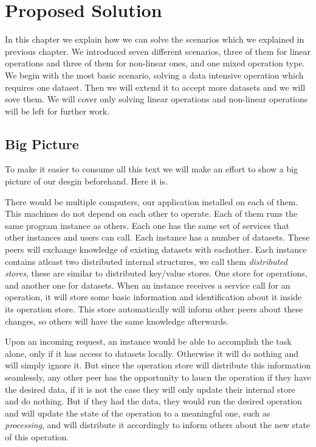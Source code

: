 \chapter{Proposed Solution}
\label{cha:proposal}
In this chapter we explain how we can solve the scenarios which we explained in previous chapter.
We introduced seven different scenarios, three of them for linear operations and three of them for non-linear
ones, and one mixed operation type. We begin with the most basic scenario, solving a data intensive operation
which requires one dataset. Then we will extend it to accept more datasets and we will sove them. We will
cover only solving linear operations and non-linear operations will be left for further work.

\section{Big Picture}
To make it easier to consume all this text we will make an effort to show a big picture of our desgin beforehand. Here it is.

There would be multiple computers, our application installed on each of them. This machines do not depend on each
other to operate. Each of them runs the same program instance as others. Each one has the same set of services that
other instances and users can call. Each instance has a number of datasets. These peers will exchange knowledge of
existing datasets with eachother. Each instance contains atleast two distributed internal structures,
we call them \textit{distributed stores}, these are similar to distributed key/value stores.
One store for operations, and another one for datasets. When an instance receives a service call for an operation, it
will store some basic information and identification about it inside its operation store. This store automatically will
inform other peers about these changes, so others will have the same knowledge afterwards.

Upon an incoming request, an instance would be able to accomplish the task alone, only if it has access to datasets locally.
Otherwise it will do nothing and will simply ignore it. But since the operation store will distribute this information
seamlessly, any other peer has the opportunity to laucn the operation if they have the desired data, if it is not the case
they will only update their internal store and do nothing. But if they had the data, they would run the desired operation
and will update the state of the operation to a meaningful one, such as \textit{processing}, and will distribute it
accordingly to inform others about the new state of this operation.

